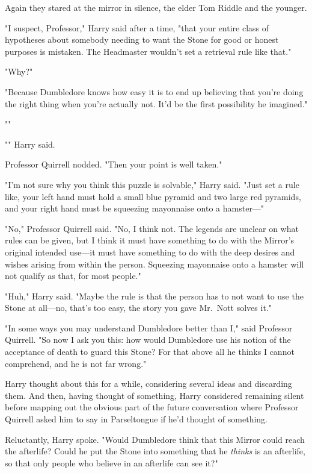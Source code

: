 Again they stared at the mirror in silence, the elder Tom Riddle and the
younger.

"I suspect, Professor," Harry said after a time, "that your entire class of
hypotheses about somebody needing to want the Stone for good or honest purposes
is mistaken. The Headmaster wouldn't set a retrieval rule like that."

"Why?"

"Because Dumbledore knows how easy it is to end up believing that you're doing
the right thing when you're actually not. It'd be the first possibility he
imagined."

""

"" Harry said.

Professor Quirrell nodded. "Then your point is well taken."

"I'm not sure why you think this puzzle is solvable," Harry said. "Just set a
rule like, your left hand must hold a small blue pyramid and two large red
pyramids, and your right hand must be squeezing mayonnaise onto a hamster—"

"No," Professor Quirrell said. "No, I think not. The legends are unclear on
what rules can be given, but I think it must have something to do with the
Mirror's original intended use—it must have something to do with the deep
desires and wishes arising from within the person. Squeezing mayonnaise onto a
hamster will not qualify as that, for most people."

"Huh," Harry said. "Maybe the rule is that the person has to not want to use
the Stone at all—no, that's too easy, the story you gave Mr.~Nott solves it."

"In some ways you may understand Dumbledore better than I," said Professor
Quirrell. "So now I ask you this: how would Dumbledore use his notion of the
acceptance of death to guard this Stone? For that above all he thinks I cannot
comprehend, and he is not far wrong."

Harry thought about this for a while, considering several ideas and discarding
them. And then, having thought of something, Harry considered remaining
silent{\el} before mapping out the obvious part of the future conversation
where Professor Quirrell asked him to say in Parseltongue if he'd thought of
something.

Reluctantly, Harry spoke. "Would Dumbledore think that this Mirror could reach
the afterlife? Could he put the Stone into something that he \emph{thinks} is
an afterlife, so that only people who believe in an afterlife can see it?"

